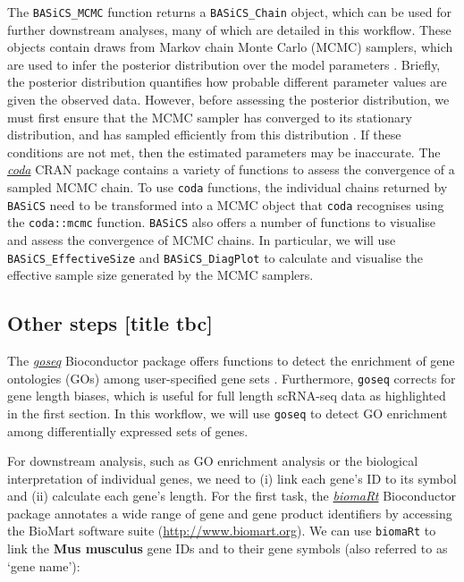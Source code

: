 \documentclass[9pt,a4paper,]{extarticle}
\begin{document}
The \texttt{BASiCS\_MCMC} function returns a \texttt{BASiCS\_Chain} object, which can be used
for further downstream analyses, many of which are detailed in this workflow.
These objects contain draws from Markov chain Monte Carlo (MCMC) samplers,
which are used to infer the posterior distribution over the model parameters
\citep{Smith1993}.
Briefly, the posterior distribution quantifies how probable different parameter
values are given the observed data. However, before assessing the posterior
distribution, we must first ensure that the MCMC sampler has converged to
its stationary distribution, and has sampled efficiently from this distribution
\citep{Cowles1996}. If these conditions are not met, then the estimated parameters
may be inaccurate. The \emph{\href{https://CRAN.R-project.org/package=coda}{coda}} CRAN package contains a variety of
functions to assess the convergence of a sampled MCMC chain.
To use \texttt{coda} functions, the individual chains returned by \texttt{BASiCS} need to be
transformed into a MCMC object that \texttt{coda} recognises using the \texttt{coda::mcmc}
function. \texttt{BASiCS} also offers a number of functions to visualise and assess the
convergence of MCMC chains. In particular, we will use
\texttt{BASiCS\_EffectiveSize} and \texttt{BASiCS\_DiagPlot} to calculate and visualise the
effective sample size generated by the MCMC samplers.

\hypertarget{other-steps-title-tbc}{%
\subsection{Other steps {[}title tbc{]}}\label{other-steps-title-tbc}}

The \emph{\href{https://bioconductor.org/packages/3.11/goseq}{goseq}} Bioconductor package offers functions to detect the
enrichment of gene ontologies (GOs) among user-specified gene sets \citep{Young2010}.
Furthermore, \texttt{goseq} corrects for gene length biases, which is useful for full
length scRNA-seq data as highlighted in the first section.
In this workflow, we will use \texttt{goseq} to detect GO enrichment among
differentially expressed sets of genes.

For downstream analysis, such as GO enrichment analysis or the biological
interpretation of individual genes, we need to (i) link each gene's ID to its
symbol and (ii) calculate each gene's length.
For the first task, the \emph{\href{https://bioconductor.org/packages/3.11/biomaRt}{biomaRt}} Bioconductor package annotates a
wide range of gene and gene product identifiers \citep{Durinck2005} by accessing the
BioMart software suite (\url{http://www.biomart.org}).
We can use \texttt{biomaRt} to link the \textbf{Mus musculus} gene IDs and to their gene
symbols (also referred to as `gene name'):

{\small}
\end{document}
